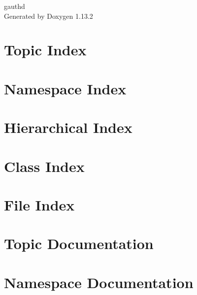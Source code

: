 \documentclass[twoside]{book}
\newcommand{\+}{\discretionary{\mbox{\scriptsize$\hookleftarrow$}}{}{}}
\newcommand{\clearemptydoublepage}{%
    \newpage{\pagestyle{empty}\cleardoublepage}%
  }
\begin{document}
  \raggedbottom
    \hypersetup{pageanchor=false,
                bookmarksnumbered=true,
                pdfencoding=unicode
               }
  \begin{titlepage}
  \vspace*{7cm}
  \begin{center}%
  {\Large gauthd}\\
  \vspace*{1cm}
  {\large Generated by Doxygen 1.13.2}\\
  \end{center}
  \end{titlepage}
  \clearemptydoublepage
  \tableofcontents
  \clearemptydoublepage
  \hypersetup{pageanchor=true}

\chapter{Topic Index}

\chapter{Namespace Index}

\chapter{Hierarchical Index}

\chapter{Class Index}

\chapter{File Index}

\chapter{Topic Documentation}




\chapter{Namespace Documentation}

\end{document}
